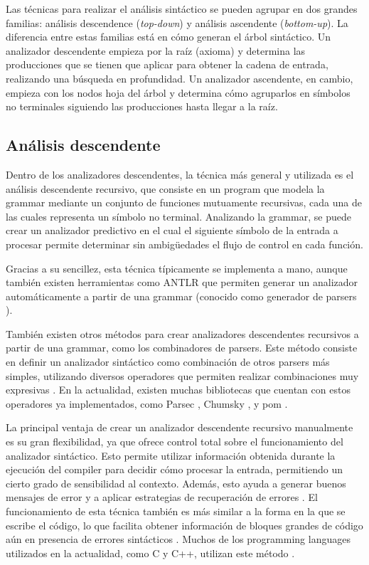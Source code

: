 Las técnicas para realizar el análisis sintáctico se pueden agrupar en dos
grandes familias: análisis descendence (\textit{top-down}) y análisis ascendente
(\textit{bottom-up}). La diferencia entre estas familias está en cómo generan el
árbol sintáctico. Un analizador descendente empieza por la raíz (axioma) y
determina las producciones que se tienen que aplicar para obtener la cadena de
entrada, realizando una búsqueda en profundidad. Un analizador ascendente, en
cambio, empieza con los nodos hoja del árbol y determina cómo agruparlos en
símbolos no terminales siguiendo las producciones hasta llegar a la raíz.
\parencite{dragon-book}

\subsection{Análisis descendente}

Dentro de los analizadores descendentes, la técnica más general y utilizada es
el análisis descendente recursivo, que consiste en un \gls{program} que modela la
\gls{grammar} mediante un conjunto de funciones mutuamente recursivas, cada una
de las cuales representa un símbolo no terminal. Analizando la \gls{grammar}, se
puede crear un analizador predictivo en el cual el siguiente símbolo de la
entrada a procesar permite determinar sin ambigüedades el flujo de control en
cada función. \parencite{dragon-book}

Gracias a su sencillez, esta técnica típicamente se implementa a mano, aunque
también existen herramientas como ANTLR \parencite{ANTLR} que permiten generar
un analizador automáticamente a partir de una \gls{grammar} (conocido como
generador de \glspl{parser} \parencite{dragon-book}).

También existen otros métodos para crear analizadores descendentes
recursivos a partir de una \gls{grammar}, como los combinadores de
\glspl{parser}. Este método consiste en definir un analizador sintáctico como
combinación de otros \glspl{parser} más simples, utilizando diversos operadores
que permiten realizar combinaciones muy expresivas
\parencite{parser-combinators}. En la actualidad, existen muchas bibliotecas que
cuentan con estos operadores ya implementados, como Parsec \parencite{parsec}, Chumsky
\parencite{chumsky}, y pom \parencite{pom}.

La principal ventaja de crear un analizador descendente recursivo manualmente es
su gran flexibilidad, ya que ofrece control total sobre el funcionamiento del
analizador sintáctico. Esto permite utilizar información obtenida durante la
ejecución del \gls{compiler} para decidir cómo procesar la entrada, permitiendo
un cierto grado de sensibilidad al contexto. Además, esto ayuda a generar buenos
mensajes de error y a aplicar estrategias de recuperación de errores
\parencite{errors-clang}. El funcionamiento de esta técnica también es más
similar a la forma en la que se escribe el código, lo que facilita obtener
información de bloques grandes de código aún en presencia de errores sintácticos
\parencite{resilient-LL-parsing}. Muchos de los \glspl{programming language}
utilizados en la actualidad, como C y C++, utilizan este método
\parencite{parser-types-survey}.

